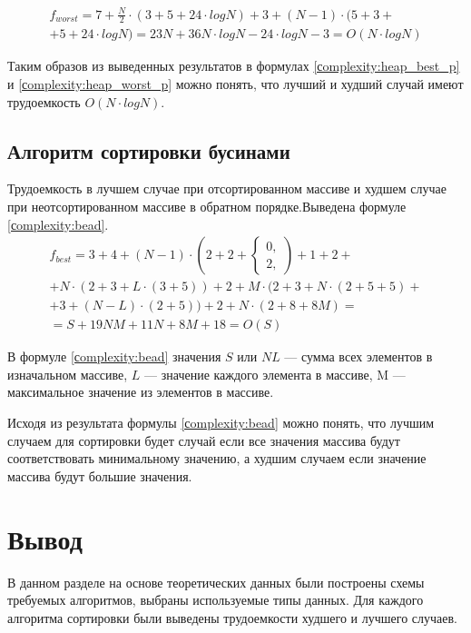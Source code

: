 \begin{equation}
	\label{сomplexity:heap_worst_p}
	\begin{aligned}
		f_{worst} = 7 + \frac{N}{2} \cdot (3 + 5 + 24 \cdot log N) + 3 + (N - 1) \cdot (5 + 3 + \\ 
		+ 5 + 24 \cdot log N) = 23N + 36N \cdot log N - 24 \cdot log N - 3 = O(N \cdot log N)
	\end{aligned}
\end{equation}

Таким образов из выведенных результатов в формулах \ref{сomplexity:heap_best_p} и \ref{сomplexity:heap_worst_p} можно понять, что лучший и худший случай имеют трудоемкость $O(N \cdot log N)$.

\subsection{Алгоритм сортировки бусинами}

Трудоемкость в лучшем случае при отсортированном массиве и худшем случае при неотсортированном массиве в обратном порядке.Выведена формуле \ref{сomplexity:bead}.
\begin{equation}
	\label{сomplexity:bead}
	\begin{aligned}
		f_{best} = 3 + 4 + (N - 1) \cdot (2 + 2 + 
		\begin{cases}
			0, \\
			2,
		\end{cases}) 
		+ 1 + 2 + \\
		+ N \cdot (2 + 3 + L \cdot (3 + 5)) + 2 + M \cdot (2 + 3 + N \cdot (2 + 5 + 5) + \\
		+3 + (N - L) \cdot (2 + 5)) + 2 + N \cdot (2 + 8 + 8M) = \\
		= S + 19NM + 11N + 8M + 18 = O(S)
	\end{aligned}
\end{equation}

В формуле \ref{сomplexity:bead} значения $S$ или $NL$ --- сумма всех элементов в изначальном массиве, $L$ --- значение каждого элемента в массиве,  M --- максимальное значение из элементов в массиве.

Исходя из результата формулы \ref{сomplexity:bead} можно понять, что лучшим случаем для сортировки будет случай если все значения массива будут соответствовать минимальному значению, а худшим случаем если значение массива будут большие значения. 

\clearpage

\section*{Вывод}

В данном разделе на основе теоретических данных были построены схемы
требуемых алгоритмов, выбраны используемые типы данных. Для каждого алгоритма сортировки были выведены трудоемкости худшего и лучшего случаев.